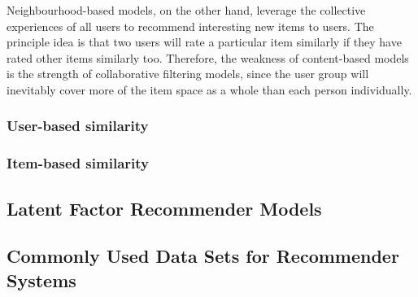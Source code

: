 Neighbourhood-based models, on the other hand, leverage the collective experiences of all users to recommend interesting new items to users. The principle idea is that two users will rate a particular item similarly if they have rated other items similarly too. Therefore, the weakness of content-based models is the strength of collaborative filtering models, since the user group will inevitably cover more of the item space as a whole than each person individually.



\subsubsection{User-based similarity}
\subsubsection{Item-based similarity}

\subsection{Latent Factor Recommender Models}

\subsection{Commonly Used Data Sets for Recommender Systems}